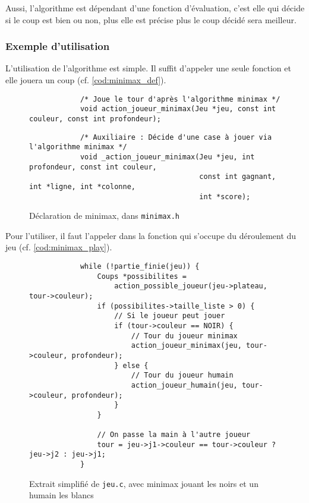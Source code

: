 \documentclass{article}
\begin{document}
Aussi, l'algorithme est dépendant d'une fonction d'évaluation, c'est elle qui
décide si le coup est bien ou non, plus elle est précise plus le coup décidé sera
meilleur.

\subsubsection{Exemple d'utilisation}
L'utilisation de l'algorithme est simple. Il suffit d'appeler une seule fonction
et elle jouera un coup (cf. \autoref{cod:minimax_def}).
\begin{figure}[h]
    \centering
    \begin{minipage}{0.8\textwidth}
        \begin{verbatim}
            /* Joue le tour d'après l'algorithme minimax */
            void action_joueur_minimax(Jeu *jeu, const int couleur, const int profondeur);
        \end{verbatim}

        \begin{verbatim}
            /* Auxiliaire : Décide d'une case à jouer via l'algorithme minimax */
            void _action_joueur_minimax(Jeu *jeu, int profondeur, const int couleur,
                                        const int gagnant, int *ligne, int *colonne,
                                        int *score);
        \end{verbatim}
    \end{minipage}
    \caption{Déclaration de minimax, dans \texttt{minimax.h}}
    \label{cod:minimax_def}
\end{figure}

Pour l'utiliser, il faut l'appeler dans la fonction qui s'occupe du déroulement
du jeu (cf. \autoref{cod:minimax_play}).

\begin{figure}[ht]
    \centering
    \begin{minipage}{0.8\textwidth}
        \begin{verbatim}
            while (!partie_finie(jeu)) {
                Coups *possibilites =
                    action_possible_joueur(jeu->plateau, tour->couleur);
                if (possibilites->taille_liste > 0) {
                    // Si le joueur peut jouer
                    if (tour->couleur == NOIR) {
                        // Tour du joueur minimax
                        action_joueur_minimax(jeu, tour->couleur, profondeur);
                    } else {
                        // Tour du joueur humain
                        action_joueur_humain(jeu, tour->couleur, profondeur);
                    }
                }

                // On passe la main à l'autre joueur
                tour = jeu->j1->couleur == tour->couleur ? jeu->j2 : jeu->j1;
            }
        \end{verbatim}
    \end{minipage}
    \caption{Extrait simplifié de \texttt{jeu.c}, avec minimax jouant les noirs et un humain les blancs}
    \label{cod:minimax_play}
\end{figure}
\end{document}
